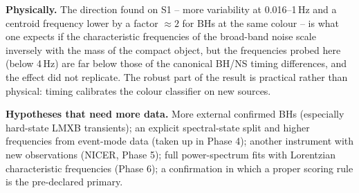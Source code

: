\textbf{Physically.} The direction found on S1 -- more variability at 0.016--1\,Hz and a centroid frequency lower by a
factor $\approx2$ for BHs at the same colour -- is what one expects if the characteristic frequencies of the broad-band
noise scale inversely with the mass of the compact object, but the frequencies probed here (below 4\,Hz) are far below
those of the canonical BH/NS timing differences, and the effect did not replicate. The robust part of the result is
practical rather than physical: timing calibrates the colour classifier on new sources.

\textbf{Hypotheses that need more data.} More external confirmed BHs (especially hard-state LMXB transients); an
explicit spectral-state split and higher frequencies from event-mode data (taken up in Phase 4); another instrument with
new observations (NICER, Phase 5); full power-spectrum fits with Lorentzian characteristic frequencies (Phase 6); a
confirmation in which a proper scoring rule is the pre-declared primary.

